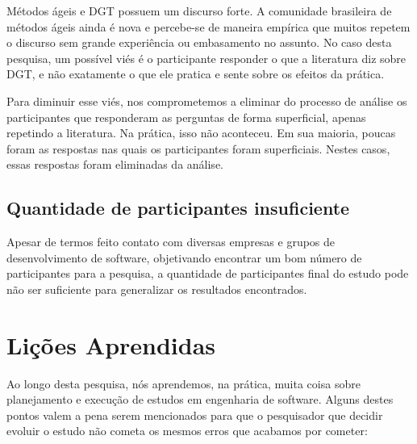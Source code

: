 Métodos ágeis e DGT possuem um discurso forte. A comunidade brasileira de métodos
ágeis ainda é nova e percebe-se de maneira empírica que muitos repetem o discurso
sem grande experiência ou embasamento no assunto.
No caso desta pesquisa, um possível viés é o participante responder o que
a literatura diz sobre DGT, e não exatamente o que ele pratica e sente sobre
os efeitos da prática. 

Para diminuir esse viés, nos comprometemos a eliminar do processo de análise os participantes
que responderam as perguntas de forma superficial, apenas repetindo a literatura. Na prática,
isso não aconteceu. Em sua maioria, poucas foram as respostas nas quais os participantes
foram superficiais. Nestes casos, essas respostas foram eliminadas da análise.

\subsection{Quantidade de participantes insuficiente}

Apesar de termos feito contato
com diversas empresas e grupos de desenvolvimento de software,
objetivando encontrar um bom número de participantes para a pesquisa,
a quantidade de participantes final do estudo pode não ser suficiente para generalizar
os resultados encontrados. 

\section{Lições Aprendidas}

Ao longo desta pesquisa, nós aprendemos, na prática, muita coisa sobre planejamento
e execução de estudos em engenharia de software. Alguns destes pontos valem
a pena serem mencionados para que o pesquisador que decidir evoluir o estudo
não cometa os mesmos erros que acabamos por cometer:

